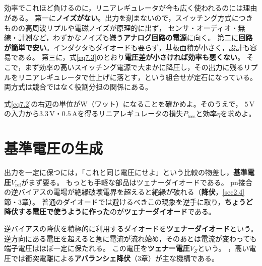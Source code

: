\subsection{}

効率でこれほど負けるのに，リニアレギュレータが今も広く使われるのには理由がある。
第一に\textbf{ノイズがない}。出力を刻まないので，スイッチング方式につきものの高周波リプルや電磁ノイズが原理的に出ず，
センサ・オーディオ・無線・計測など，わずかなノイズも嫌う\textbf{アナログ回路の電源}に向く。
第二に\textbf{回路が簡単で安い}。インダクタもダイオードも要らず，基板面積が小さく，設計も容易である。
第三に，式\ref{eq7.3}のとおり\textbf{電圧差が小さければ効率も悪くない}。
そこで，まず効率の高いスイッチング電源で大まかに降圧し，その出力に残るリプルをリニアレギュレータで仕上げに落とす，という組合せが定石になっている。
両方式は競合ではなく役割分担の関係にある。

\begin{問}
\item 式\ref{eq7.2}の右辺の単位がW（ワット）になることを確かめよ。そのうえで，
$5$\,Vの入力から$3.3$\,V・$0.5$\,Aを得るリニアレギュレータの損失$P_{\mathrm{loss}}$と効率$\eta$を求めよ。
\end{問}

\section{基準電圧の生成}
\label{sec7.2}

出力を一定に保つには，「これと同じ電圧にせよ」という比較の物差し，\textbf{基準電圧}$V_{\mathrm{ref}}$がまず要る。
もっとも手軽な部品はツェナーダイオードである。
pn接合の逆バイアスの電場が絶縁破壊電界を超えると絶縁が破れる（\textbf{降伏}，\ref{sec2.4}節・3章）。
普通のダイオードでは避けるべきこの現象を逆手に取り，\textbf{ちょうど降伏する電圧で使うように作った}のが\textbf{ツェナーダイオード}である。

\begin{定義}[ツェナーダイオード]
\label{def7.2}
逆バイアスの降伏を積極的に利用するダイオードを\textbf{ツェナーダイオード}という。
逆方向にある電圧を超えると急に電流が流れ始め，そのあとは電流が変わっても端子電圧はほぼ一定に保たれる。
この電圧を\textbf{ツェナー電圧}$V_Z$という。
，高い電圧では衝突電離による\textbf{アバランシェ降伏}（3章）が主な機構である。
\end{定義}

